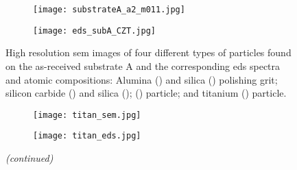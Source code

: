 \begin{figure}
\begin{subfigure}[t]{\textwidth}
\begin{minipage}[t]{0.43\linewidth}
            \centering
            \texttt{[image: substrateA\_a2\_m011.jpg]}
          \end{minipage}
          \hfill
          \begin{minipage}[t]{0.43\linewidth}
            \centering
            \texttt{[image: eds\_subA\_CZT.jpg]}
          \end{minipage}
          \begin{minipage}[t]{0.11\linewidth}
            \centering
            \atomicTable[&][&][&]
          \end{minipage}
    \end{subfigure}
    \caption[\Ac{sem} images, \ac{eds} spectra, and \ac{eds} atomic compositions of four different types of particles found on as-received substrate A.]{High resolution \acf{sem} images of four different types of particles found on the as-received substrate A and the corresponding \acf{eds} spectra and atomic compositions:  Alumina () and silica () polishing grit;  silicon carbide () and silica ();   () particle; and  titanium () particle.}\label{fig:subAa_sem_w_eds}
\end{figure}

\begin{figure}[htbp]
\ContinuedFloat
    \centering
    \begin{subfigure}[t]{\textwidth}
        \caption{}\label{fig:subAa_titanium-particle}
          \begin{minipage}[t]{0.43\linewidth}
            \centering
            \texttt{[image: titan\_sem.jpg]}
          \end{minipage}
          \hfill
          \begin{minipage}[t]{0.43\linewidth}
            \centering
            \texttt{[image: titan\_eds.jpg]}
          \end{minipage}
          \begin{minipage}[t]{0.11\linewidth}
            \centering
            \atomicTable[&][&][&]
          \end{minipage}
    \end{subfigure}
    \captionsetup{list=no}
    \caption{\emph{(continued)}}
\end{figure}

